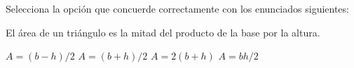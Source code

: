 Selecciona la opción que concuerde correctamente con los enunciados siguientes:

\begin{parts}

    El área de un triángulo es la mitad del producto de la base por la altura.

    \begin{choices}
        \choice $A = (b -h) / 2$
        \choice $A = (b +h) / 2$
        \choice $A = 2(b +h)$
        \CorrectChoice $A = bh / 2$
    \end{choices}

\end{parts}
